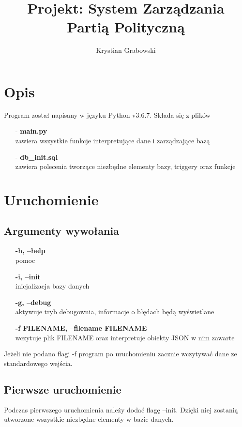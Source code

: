 \documentclass[a4paper]{article}
\title{Projekt: System Zarządzania Partią Polityczną}
\author{Krystian Grabowski}
\begin{document}
\maketitle
\section{Opis}
Program został napisany w języku Python v3.6.7. Składa się z plików
\begin{itemize}
    \itemsep0em
    \item[-] \textbf{main.py} \\ zawiera wszystkie funkcje interpretujące dane i zarządzające bazą
    \item[-] \textbf{db\_init.sql} \\ zawiera polecenia tworzące niezbędne elementy bazy, triggery oraz funkcje
\end{itemize}
  

\section{Uruchomienie}
\subsection{Argumenty wywołania}
\begin{itemize}
    \itemsep0em
    \item[] \textbf{-h, --help} \\ pomoc
    \item[] \textbf{-i, --init} \\  inicjalizacja bazy danych
    \item[] \textbf{-g, --debug} \\  aktywuje tryb debugownia, 
        informacje o błędach będą wyświetlane
    \item[] \textbf{-f FILENAME, --filename FILENAME} \\ wczytuje plik FILENAME 
    oraz interpretuje obiekty JSON w nim zawarte
\end{itemize}
Jeżeli nie podano flagi -f program po uruchomieniu zacznie wczytywać dane ze standardowego wejścia.
\subsection{Pierwsze uruchomienie}
Podczas pierwszego uruchomienia należy dodać flagę --init. Dzięki niej zostanią 
utworzone wszystkie niezbędne elementy w bazie danych.
\end{document}
